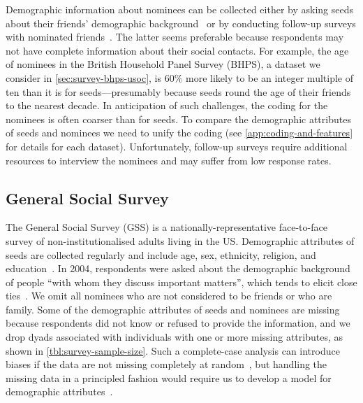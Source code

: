 \documentclass{scrartcl}
\begin{document}
Demographic information about nominees can be collected either by asking seeds about their friends' demographic background~\cite{Marsden1987,McPherson2006} or by conducting follow-up surveys with nominated friends~\cite{Johnson1989}. The latter seems preferable because respondents may not have complete information about their social contacts. For example, the age of nominees in the British Household Panel Survey (BHPS), a dataset we consider in \cref{sec:survey-bhps-usoc}, is 60\% more likely to be an integer multiple of ten than it is for seeds---presumably because seeds round the age of their friends to the nearest decade. In anticipation of such challenges, the coding for the nominees is often coarser than for seeds. To compare the demographic attributes of seeds and nominees we need to unify the coding (see \cref{app:coding-and-features} for details for each dataset). Unfortunately, follow-up surveys require additional resources to interview the nominees and may suffer from low response rates.


\subsection{General Social Survey\label{sec:survey-gss}}

The General Social Survey (GSS) is a nationally-representative face-to-face survey of non-institutionalised adults living in the US. Demographic attributes of seeds are collected regularly and include age, sex, ethnicity, religion, and education~\cite{Marsden1987,Marsden1988}. In 2004, respondents were asked about the demographic background of people ``with whom they discuss important matters'', which tends to elicit close ties~\cite{Marin2004}. We omit all nominees who are not considered to be friends or who are family. Some of the demographic attributes of seeds and nominees are missing because respondents did not know or refused to provide the information, and we drop dyads associated with individuals with one or more missing attributes, as shown in \cref{tbl:survey-sample-size}. Such a complete-case analysis can introduce biases if the data are not missing completely at random~\cite{Rubin1976}, but handling the missing data in a principled fashion would require us to develop a model for demographic attributes~\cite{Pigott2001, Gelman2013}.
\end{document}
